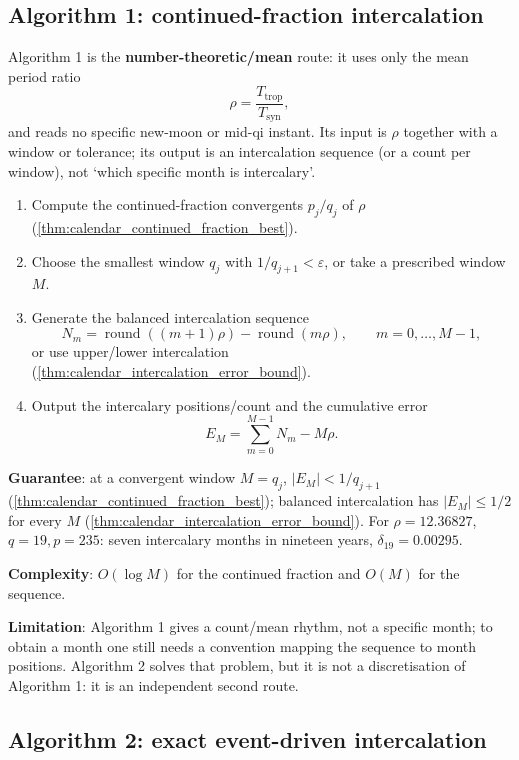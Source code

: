 \subsection{Algorithm 1: continued-fraction intercalation}
\label{subsec:continued_fraction_intercalation_algorithm}

Algorithm 1 is the \textbf{number-theoretic/mean} route: it uses only the mean period ratio
\[
\rho=\frac{T_{\text{trop}}}{T_{\text{syn}}},
\]
and reads no specific new-moon or mid-qi instant. Its input is \(\rho\) together with a window or tolerance; its output is an intercalation sequence (or a count per window), not `which specific month is intercalary'.

\begin{enumerate}[label=\textbf{Step \arabic*.}, leftmargin=*]
    \item Compute the continued-fraction convergents \(p_j/q_j\) of \(\rho\) (\cref{thm:calendar_continued_fraction_best}).
    \item Choose the smallest window \(q_j\) with \(1/q_{j+1}<\varepsilon\), or take a prescribed window \(M\).
    \item Generate the balanced intercalation sequence
    \[
    N_m=\operatorname{round}((m+1)\rho)-\operatorname{round}(m\rho),
    \qquad m=0,\dots,M-1,
    \]
    or use upper/lower intercalation (\cref{thm:calendar_intercalation_error_bound}).
    \item Output the intercalary positions/count and the cumulative error
    \[
    E_M=\sum_{m=0}^{M-1}N_m-M\rho.
    \]
\end{enumerate}

\textbf{Guarantee}: at a convergent window \(M=q_j\), \(|E_M|<1/q_{j+1}\) (\cref{thm:calendar_continued_fraction_best}); balanced intercalation has \(|E_M|\le1/2\) for every \(M\) (\cref{thm:calendar_intercalation_error_bound}). For \(\rho=12.36827\), \(q=19,p=235\): seven intercalary months in nineteen years, \(\delta_{19}=0.00295\).

\textbf{Complexity}: \(O(\log M)\) for the continued fraction and \(O(M)\) for the sequence.

\textbf{Limitation}: Algorithm 1 gives a count/mean rhythm, not a specific month; to obtain a month one still needs a convention mapping the sequence to month positions. Algorithm 2 solves that problem, but it is not a discretisation of Algorithm 1: it is an independent second route.

\subsection{Algorithm 2: exact event-driven intercalation}
\label{subsec:exact_intercalation_algorithm}

